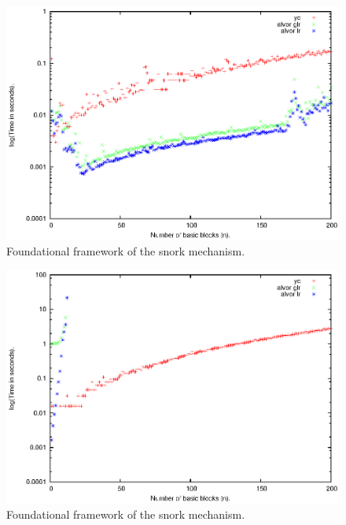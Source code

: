\documentclass{sigplanconf}
\begin{document}
\begin{figure}
    \begin{center}
        \includegraphics[scale=0.65]{Graphics/m1.eps}
    \end{center}
    \caption{Foundational framework of the snork mechanism.}
    \label{fig-ffsm}
\end{figure}

\begin{figure}
    \begin{center}
        \includegraphics[scale=0.65]{Graphics/m2.eps}
    \end{center}
    \caption{Foundational framework of the snork mechanism.}
    \label{fig-ffsm}
\end{figure}
\end{document}
